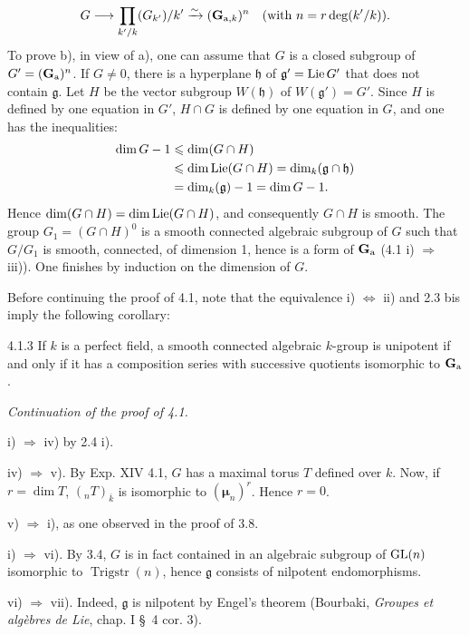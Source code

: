 \[
 G\longrightarrow\prod_{k'/k}(G_{k'})/k'\xrightarrow{\sim}(\mathbf G_{\mathrm a,k})^n
 \quad\text{(with }n=r\deg(k'/k)\text{)}.
\]
To prove b), in view of a), one can assume that $G$ is a closed subgroup of $G'=(\mathbf{G}_{\mathrm{a}})^n$. If $G\neq0$, there is a hyperplane $\mathfrak h$ of $\mathfrak g'=\operatorname{Lie} G'$ that does not contain $\mathfrak g$. Let $H$ be the vector subgroup $W(\mathfrak h)$ of $W(\mathfrak g')=G'$. Since $H$ is defined by one equation in $G'$, $H\cap G$ is defined by one equation in $G$, and one has the inequalities:
\[
\begin{aligned}
 \dim G-1&\leqslant\dim(G\cap H)\\
 &\leqslant\dim\operatorname{Lie}(G\cap H)=\dim_k(\mathfrak g\cap\mathfrak h)\\
 &=\dim_k(\mathfrak g)-1=\dim G-1.
\end{aligned}
\]
Hence $\dim(G\cap H)=\dim\operatorname{Lie}(G\cap H)$, and consequently $G\cap H$ is smooth. The group $G_1=(G\cap H)^0$ is a smooth connected algebraic subgroup of $G$ such that $G/G_1$ is smooth, connected, of dimension 1, hence is a form of $\mathbf{G}_{\mathrm{a}}$ (4.1 i) $\Rightarrow$ iii)).
One finishes by induction on the dimension of $G$.

Before continuing the proof of 4.1, note that the equivalence i) $\Leftrightarrow$ ii) and 2.3 bis imply the following corollary:
\begin{corollary}{4.1.3}\label{XVII.4.1.3}
If $k$ is a perfect field, a smooth connected algebraic $k$-group is unipotent if and only if it has a composition series with successive quotients isomorphic to $\mathbf{G}_{\mathrm{a}}$.
\end{corollary}
\noindent\emph{Continuation of the proof of 4.1.}

\noindent i) $\Rightarrow$ iv) by 2.4 i).

\noindent iv) $\Rightarrow$ v). By Exp. XIV 4.1, $G$ has a maximal torus $T$ defined over $k$. Now, if $r=\dim T$, $({}_nT)_{\overline k}$ is isomorphic to $(\boldsymbol\mu_n)^r$. Hence $r=0$.

\noindent v) $\Rightarrow$ i), as one observed in the proof of 3.8.

\noindent i) $\Rightarrow$ vi). By 3.4, $G$ is in fact contained in an algebraic subgroup of $\operatorname{GL}(n)$ isomorphic to $\operatorname{Trigstr}(n)$, hence $\mathfrak g$ consists of nilpotent endomorphisms.

\noindent vi) $\Rightarrow$ vii). Indeed, $\mathfrak g$ is nilpotent by Engel's theorem (Bourbaki, \emph{Groupes et algèbres de Lie}, chap. I \S~4 cor. 3).

